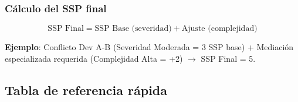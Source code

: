 \subsubsection{Cálculo del SSP final}

\begin{equation}
    \text{SSP Final} = \text{SSP Base (severidad)} + \text{Ajuste (complejidad)}
\end{equation}

\textbf{Ejemplo}: Conflicto Dev A-B (Severidad Moderada = 3 SSP base) + Mediación especializada requerida (Complejidad Alta = +2) $\rightarrow$ SSP Final = 5.

\subsection{Tabla de referencia rápida}

\begingroup
\scriptsize
\renewcommand{\arraystretch}{1.4}
\setlength{\tabcolsep}{4pt}
\setlength{\LTleft}{0pt}
\setlength{\LTright}{0pt}

